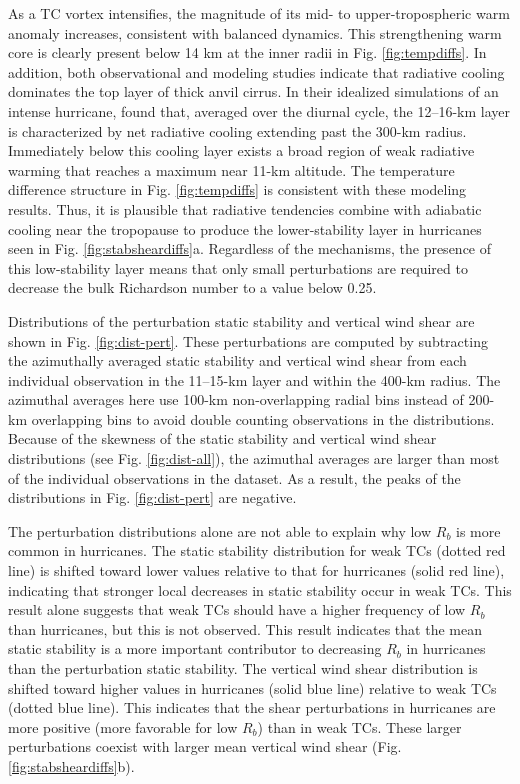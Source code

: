 As a TC vortex intensifies, the magnitude of its mid- to upper-tropospheric warm anomaly increases, consistent with balanced dynamics.
This strengthening warm core is clearly present below 14 km at the inner radii in Fig. \ref{fig:tempdiffs}.
In addition, both observational \citep{Garrettetal2005} and modeling \citep{Buetal2014} studies indicate that radiative cooling dominates the top layer of thick anvil cirrus.
In their idealized simulations of an intense hurricane, \cite{Buetal2014} found that, averaged over the diurnal cycle, the 12--16-km layer is characterized by net radiative cooling extending past the 300-km radius.
Immediately below this cooling layer exists a broad region of weak radiative warming that reaches a maximum near 11-km altitude.
The temperature difference structure in Fig. \ref{fig:tempdiffs} is consistent with these modeling results.
Thus, it is plausible that radiative tendencies combine with adiabatic cooling near the tropopause to produce the lower-stability layer in hurricanes seen in Fig. \ref{fig:stabsheardiffs}a.
Regardless of the mechanisms, the presence of this low-stability layer means that only small perturbations are required to decrease the bulk Richardson number to a value below 0.25.

Distributions of the perturbation static stability and vertical wind shear are shown in Fig. \ref{fig:dist-pert}.
These perturbations are computed by subtracting the azimuthally averaged static stability and vertical wind shear from each individual observation in the 11–15-km layer and within the 400-km radius.
The azimuthal averages here use 100-km non-overlapping radial bins instead of 200-km overlapping bins to avoid double counting observations in the distributions.
Because of the skewness of the static stability and vertical wind shear distributions (see Fig. \ref{fig:dist-all}), the azimuthal averages are larger than most of the individual observations in the dataset.
As a result, the peaks of the distributions in Fig. \ref{fig:dist-pert} are negative.

The perturbation distributions alone are not able to explain why low $R_b$ is more common in hurricanes.
The static stability distribution for weak TCs (dotted red line) is shifted toward lower values relative to that for hurricanes (solid red line), indicating that stronger local decreases in static stability occur in weak TCs.
This result alone suggests that weak TCs should have a higher frequency of low $R_b$ than hurricanes, but this is not observed.
This result indicates that the mean static stability is a more important contributor to decreasing $R_b$ in hurricanes than the perturbation static stability.
The vertical wind shear distribution is shifted toward higher values in hurricanes (solid blue line) relative to weak TCs (dotted blue line).
This indicates that the shear perturbations in hurricanes are more positive (more favorable for low $R_b$) than in weak TCs.
These larger perturbations coexist with larger mean vertical wind shear (Fig. \ref{fig:stabsheardiffs}b).

